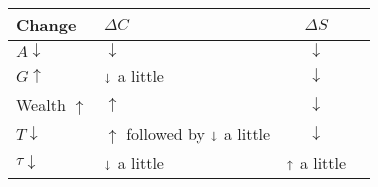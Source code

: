 \documentclass[letterpaper, 9pt,landscape]{extarticle}
\begin{document}
\begin{multicols*}{5}
\begin{remark}
    \begin{center}
    \begin{tabular}{l l c c}
    	\textbf{Change} & $\Delta C$ & $\Delta S$ \\\hline
    $A \downarrow$ & $\downarrow$ & $\downarrow$ \\
    $G \uparrow$ & $\shortdownarrow$ a little & $\downarrow$ \\
    Wealth $\uparrow$ & $\uparrow$ & $\downarrow$ \\
    $T \downarrow$ & $\uparrow$ followed by  $\shortdownarrow$ a little & $\downarrow$ \\
    $\tau \downarrow$ & $\shortdownarrow$ a little & $\shortuparrow$ a little \\
    \end{tabular}
    \end{center}
\end{remark}




\end{multicols*}
\end{document}
